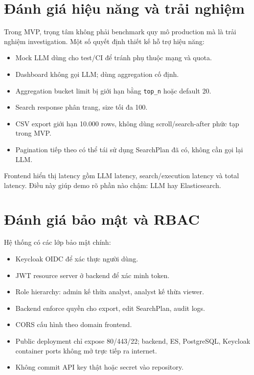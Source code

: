 \documentclass[12pt,a4paper]{report}
\begin{document}
\section{Đánh giá hiệu năng và trải nghiệm}

Trong MVP, trọng tâm không phải benchmark quy mô production mà là trải nghiệm investigation. Một số quyết định thiết kế hỗ trợ hiệu năng:

\begin{itemize}
    \item Mock LLM dùng cho test/CI để tránh phụ thuộc mạng và quota.
    \item Dashboard không gọi LLM; dùng aggregation cố định.
    \item Aggregation bucket limit bị giới hạn bằng \texttt{top\_n} hoặc default 20.
    \item Search response phân trang, size tối đa 100.
    \item CSV export giới hạn 10.000 rows, không dùng scroll/search-after phức tạp trong MVP.
    \item Pagination tiếp theo có thể tái sử dụng SearchPlan đã có, không cần gọi lại LLM.
\end{itemize}

Frontend hiển thị latency gồm LLM latency, search/execution latency và total latency. Điều này giúp demo rõ phần nào chậm: LLM hay Elasticsearch.

\section{Đánh giá bảo mật và RBAC}

Hệ thống có các lớp bảo mật chính:

\begin{itemize}
    \item Keycloak OIDC để xác thực người dùng.
    \item JWT resource server ở backend để xác minh token.
    \item Role hierarchy: admin kế thừa analyst, analyst kế thừa viewer.
    \item Backend enforce quyền cho export, edit SearchPlan, audit logs.
    \item CORS cấu hình theo domain frontend.
    \item Public deployment chỉ expose 80/443/22; backend, ES, PostgreSQL, Keycloak container ports không mở trực tiếp ra internet.
    \item Không commit API key thật hoặc secret vào repository.
\end{itemize}
\end{document}

